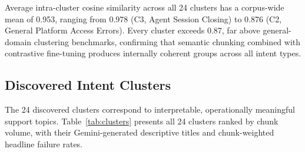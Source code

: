 \documentclass[conference]{IEEEtran}
\begin{document}
Average intra-cluster cosine similarity across all 24 clusters has a corpus-wide mean of 0.953, ranging from 0.978 (C3, Agent Session Closing) to 0.876 (C2, General Platform Access Errors). Every cluster exceeds 0.87, far above general-domain clustering benchmarks, confirming that semantic chunking combined with contrastive fine-tuning produces internally coherent groups across all intent types.

\subsection{Discovered Intent Clusters}

The 24 discovered clusters correspond to interpretable, operationally meaningful support topics. Table~\ref{tab:clusters} presents all 24 clusters ranked by chunk volume, with their Gemini-generated descriptive titles and chunk-weighted headline failure rates.
\end{document}
